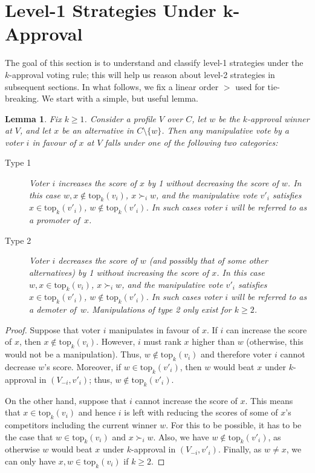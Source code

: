 \documentclass[11pt]{article}
\newtheorem{lemma}[theorem]{Lemma}
\newcommand{\tp}{\mathrm{top}}
\begin{document}

\section{Level-1 Strategies Under $\boldsymbol{k}$-Approval}\label{sec:classification}
The goal of this section is to understand and classify level-1 strategies under the $k$-approval voting rule;
this will help us reason about level-2 strategies in subsequent sections.
In what follows, we fix a linear order $>$ used for tie-breaking. We start with a simple, but useful lemma.

\begin{lemma}
\label{mantypes}
Fix $k\ge 1$.
Consider a profile $V$ over $C$, let $w$ be the $k$-approval winner at $V$, 
and let $x$ be an alternative in $C\setminus\{w\}$.
Then any manipulative vote by a voter $i$ in favour of $x$ at $V$
falls under one of the following two categories:
\begin{description}
\item[Type 1]
Voter $i$ increases the score of $x$ by 1 without decreasing the score of  $w$.
In this case $w, x\not\in\tp_k(v_i)$, $x\succ_i w$,
and the manipulative vote $v'_i$ satisfies $x\in\tp_k(v'_i)$, $w\not\in\tp_k(v'_i)$.
In such cases voter $i$ will be referred to as a {\em promoter} of~$x$.
\item[Type 2] 
Voter $i$ decreases the score of $w$ (and possibly that of some other alternatives) by 1
without increasing the score of $x$.
In this case $w, x\in\tp_k(v_i)$, $x\succ_i w$,
and the manipulative vote $v'_i$ satisfies $x\in\tp_k(v'_i)$, $w\not\in\tp_k(v'_i)$.
In such cases voter $i$ will be referred to as a {\em demoter} of~$w$.
Manipulations of type 2 only exist for $k\ge 2$.
\end{description}
\end{lemma}

\begin{proof}
Suppose that voter $i$ manipulates in favour of $x$.
If $i$ can increase the score of $x$, then $x\not\in\tp_k(v_i)$.
However, $i$ must rank $x$ higher than $w$ (otherwise, this would not be a manipulation).
Thus, $w\not\in\tp_k(v_i)$ and therefore voter $i$ cannot decrease $w$'s score.
Moreover, if $w\in\tp_k(v'_i)$, then $w$ would beat $x$ under $k$-approval in $(V_{-i}, v'_i)$;
thus, $w\not\in\tp_k(v'_i)$. 

On the other hand, suppose that $i$ cannot increase the score of $x$.
This means that $x\in\tp_k(v_i)$ and hence $i$
is left with reducing the scores of some of $x$'s competitors including the current winner $w$.
For this to be possible, it has to be the case that $w\in\tp_k(v_i)$ and $x\succ_i w$.
Also, we have $w\not\in\tp_k(v'_i)$, as otherwise $w$ would beat $x$ under $k$-approval in $(V_{-i}, v'_i)$.
Finally, as $w\neq x$, we can only have $x, w\in\tp_k(v_i)$ if $k\ge 2$.
\end{proof}
\end{document}

